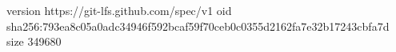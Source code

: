 version https://git-lfs.github.com/spec/v1
oid sha256:793ea8c05a0adc34946f592bcaf59f70ceb0c0355d2162fa7e32b17243cbfa7d
size 349680
